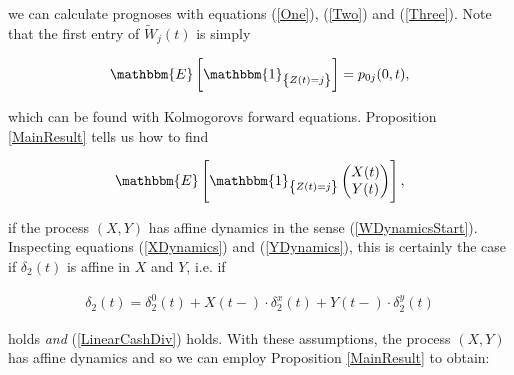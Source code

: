 \documentclass{article}
\newcommand{\1}[1]{\mathbbm{1}_{\left\lbrace #1 \right\rbrace}}
\newcommand{\expec}[1][def]{\mathbbm{E} \left[ #1 \right]}
\theoremstyle{break}
\theoremstyle{remark}
\numberwithin{equation}{section}
\begin{document}
we can calculate prognoses with equations (\ref{One}), (\ref{Two}) and (\ref{Three}). Note that the first entry of $\tilde{W}_j(t)$ is simply

\begin{align*}
	\expec[\1{Z(t)=j}] = p_{0j}(0,t),
\end{align*}

which can be found with Kolmogorovs forward equations. Proposition \ref{MainResult} tells us how to find

\begin{align*}
\expec[\1{Z(t)=j}\begin{pmatrix}X(t) \\ Y(t)\end{pmatrix}],
\end{align*}

if the process $(X,Y)$ has affine dynamics in the sense (\ref{WDynamicsStart}). Inspecting equations (\ref{XDynamics}) and (\ref{YDynamics}), this is certainly the case if $\delta_2(t)$ is affine in $X$ and $Y$, i.e. if

\begin{align} \label{LinearBenDiv}
	\delta_2(t) = \delta_2^0(t) + X(t-) \cdot \delta_2^x(t) + Y(t-) \cdot \delta_2^y(t)
\end{align}

holds \textit{and} (\ref{LinearCashDiv}) holds. With these assumptions, the process $(X,Y)$ has affine dynamics and so we can employ Proposition \ref{MainResult} to obtain:
\end{document}
